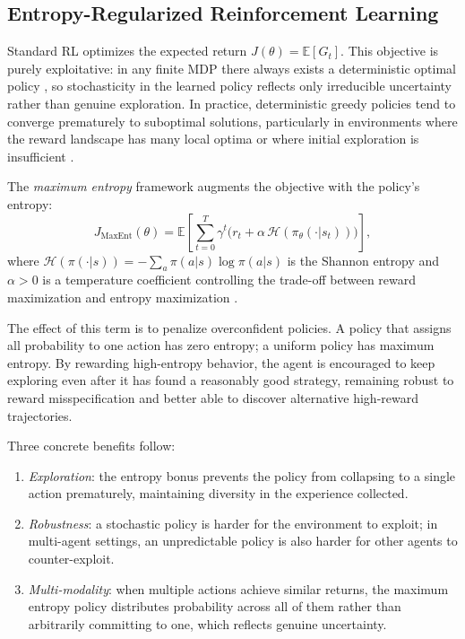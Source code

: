 \subsection{Entropy-Regularized Reinforcement Learning}
\label{sec:TheoreticalBackground_EntropyRegularized}

Standard RL optimizes the expected return $J(\theta) = \mathbb{E}[G_t]$. This objective is purely exploitative: in any finite MDP there always exists a deterministic optimal policy \citep{sutton2018reinforcement}, so stochasticity in the learned policy reflects only irreducible uncertainty rather than genuine exploration. In practice, deterministic greedy policies tend to converge prematurely to suboptimal solutions, particularly in environments where the reward landscape has many local optima or where initial exploration is insufficient \citep{haarnoja2018soft}.

The \emph{maximum entropy} framework augments the objective with the policy's entropy:
\begin{equation}
  J_{\mathrm{MaxEnt}}(\theta) = \mathbb{E}\!\left[\sum_{t=0}^{T} \gamma^t \bigl(r_t + \alpha\,\mathcal{H}(\pi_\theta(\cdot|s_t))\bigr)\right],
  \label{eq:maxent_objective}
\end{equation}
where $\mathcal{H}(\pi(\cdot|s)) = -\sum_a \pi(a|s) \log \pi(a|s)$ is the Shannon entropy and $\alpha > 0$ is a temperature coefficient controlling the trade-off between reward maximization and entropy maximization \citep{ziebart2010modeling}.

The effect of this term is to penalize overconfident policies. A policy that assigns all probability to one action has zero entropy; a uniform policy has maximum entropy. By rewarding high-entropy behavior, the agent is encouraged to keep exploring even after it has found a reasonably good strategy, remaining robust to reward misspecification and better able to discover alternative high-reward trajectories.

Three concrete benefits follow:
\begin{enumerate}
  \item \emph{Exploration}: the entropy bonus prevents the policy from collapsing to a single action prematurely, maintaining diversity in the experience collected.
  \item \emph{Robustness}: a stochastic policy is harder for the environment to exploit; in multi-agent settings, an unpredictable policy is also harder for other agents to counter-exploit.
  \item \emph{Multi-modality}: when multiple actions achieve similar returns, the maximum entropy policy distributes probability across all of them rather than arbitrarily committing to one, which reflects genuine uncertainty.
\end{enumerate}

